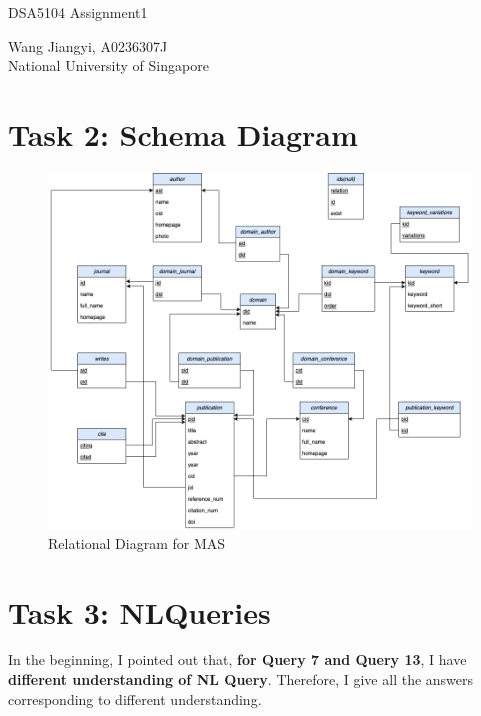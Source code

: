\documentclass{article}
\begin{document}
\begin{center}
	\Large DSA5104 Assignment1
\end{center}
\vspace{6 pt}
\begin{center}
	Wang Jiangyi, A0236307J
	\\
	National University of Singapore
\end{center}

\section{Task 2: Schema Diagram}
\begin{figure}[h]
	\centering
	\includegraphics[width=.65\textheight]{figures/relational diagram.png}
	\caption{Relational Diagram for MAS}
	\label{fig:001}
\end{figure}
\newpage
\section{Task 3: NLQueries}
In the beginning, I pointed out that, \textbf{for Query 7 and Query 13}, I have \textbf{different understanding of NL Query}. Therefore, I give all the answers corresponding to different understanding.
\end{document}
